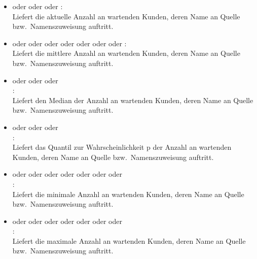 \begin{itemize}    

\item
{} oder  oder  oder :\\
Liefert die aktuelle Anzahl an wartenden Kunden, deren Name an Quelle bzw.\ Namenszuweisung  auftritt.
 
\item
{} oder  oder  oder  oder  oder  oder  oder :\\
Liefert die mittlere Anzahl an wartenden Kunden, deren Name an Quelle bzw.\ Namenszuweisung  auftritt.

\item
{} oder  oder  oder\\
:\\
Liefert den Median der Anzahl an wartenden Kunden, deren Name an Quelle bzw.\ Namenszuweisung  auftritt.

\item
{} oder  oder  oder\\
:\\
Liefert das Quantil zur Wahrscheinlichkeit p der Anzahl an wartenden Kunden, deren Name an Quelle bzw.\ Namenszuweisung  auftritt.

\item
{} oder  oder  oder  oder  oder  oder  oder\\
:\\
Liefert die minimale Anzahl an wartenden Kunden, deren Name an Quelle bzw.\ Namenszuweisung  auftritt.

\item
{} oder  oder  oder  oder  oder  oder  oder\\
:\\
Liefert die maximale Anzahl an wartenden Kunden, deren Name an Quelle bzw.\ Namenszuweisung  auftritt.


\end{itemize}
